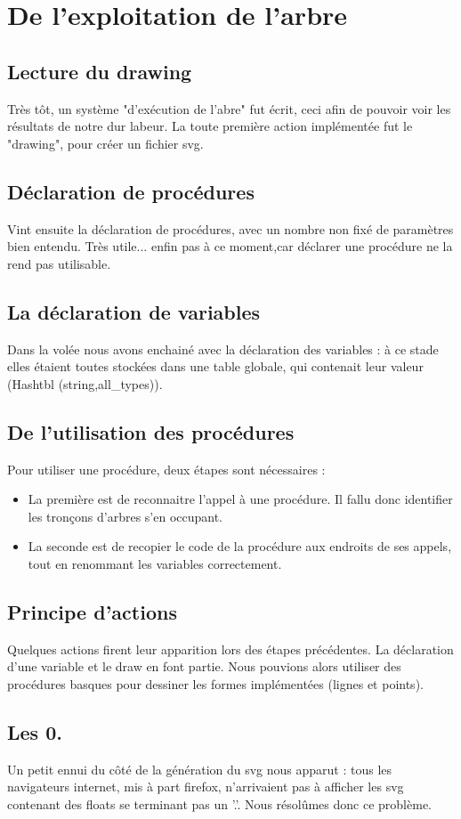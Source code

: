 \documentclass[11pt]{report} %
\begin{document}
\section{De l'exploitation de l'arbre}
\subsection{Lecture du drawing}%
Très tôt, un système "d'exécution de l'abre" fut écrit, ceci afin de pouvoir voir les résultats de notre dur labeur. La toute première action implémentée fut le "drawing", pour créer un fichier svg.
\subsection{Déclaration de procédures}
Vint ensuite la déclaration de procédures, avec un nombre non fixé de paramètres bien entendu. Très utile... enfin pas à ce moment,car déclarer une procédure ne la rend pas utilisable.
\subsection{La déclaration de variables} %
Dans la volée nous avons enchainé avec la déclaration des variables : à ce stade elles étaient toutes stockées dans une table globale, qui contenait leur valeur (Hashtbl (string,all\_types)).
\subsection{De l'utilisation des procédures}%
Pour utiliser une procédure, deux étapes sont nécessaires :
\begin{itemize}
\item La première est de reconnaitre l'appel à une procédure. Il fallu donc identifier les tronçons d'arbres s'en occupant.
\item La seconde est de recopier le code de la procédure aux endroits de ses appels, tout en renommant les variables correctement.
\end{itemize}
\subsection{Principe d'actions} %
Quelques actions firent leur apparition lors des étapes précédentes. La déclaration d'une variable et le draw en font partie. Nous pouvions alors utiliser des procédures basques pour dessiner les formes implémentées (lignes et points).
\subsection{Les 0.}
Un petit ennui du côté de la génération du svg nous apparut : tous les navigateurs internet, mis à part firefox, n'arrivaient pas à afficher les svg contenant des floats se terminant pas un '.'. Nous résolûmes donc ce problème.
\end{document}
